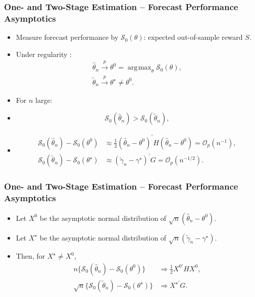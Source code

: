 \documentclass[aspectratio=169]{beamer}
\DeclareMathOperator*{\argmax}{\arg\!\max}
\begin{document}
\begin{frame}
\frametitle{One- and Two-Stage Estimation -- Forecast Performance Asymptotics}
\begin{itemize}
\item<2-> Measure forecast performance by $\mathcal{S}_0(\theta)$: expected out-of-sample reward $S$.
\item<3-> Under regularity \citep{Newey1994}:
\begin{gather*}
\hat{\theta}_n \overset{p}{\to} \theta^0 = \argmax_{\theta} \mathcal{S}_0(\theta), \\
\tilde{\theta}_n \overset{p}{\to} \theta^{\star} \neq \theta^0.
\end{gather*}
\item<4-> For $n$ large:
\item<5->[] \begin{equation*}
\mathcal{S}_0(\hat{\theta}_n) > \mathcal{S}_0(\tilde{\theta}_n),
\end{equation*}
\item<6->[] \begin{align*}
\mathcal{S}_0(\hat{\theta}_n) - \mathcal{S}_0(\theta^0) &\approx \frac{1}{2} (\hat{\theta}_n - \theta^0)^{\prime} H (\hat{\theta}_n - \theta^0) = \mathcal{O}_p(n^{-1}), \\
\mathcal{S}_0(\tilde{\theta}_n) - \mathcal{S}_0(\theta^{\star}) &\approx (\tilde{\gamma}_n - \gamma^{\star})^{\prime} G = \mathcal{O}_p(n^{-1/2}). 
\end{align*}
\end{itemize}
\end{frame}

\begin{frame}
\frametitle{One- and Two-Stage Estimation -- Forecast Performance Asymptotics}
\begin{itemize}
\item<1-> Let $X^0$ be the asymptotic normal distribution of $\sqrt{n}(\hat{\theta}_n - \theta^0)$.
\vspace{\negspace}
\item<2-> Let $X^{\star}$ be the asymptotic normal distribution of $\sqrt{n}(\tilde{\gamma}_n - \gamma^{\star})$.
\vspace{\negspace}
\item<3-> Then, for $X^{\star} \ne X^0$,
\vspace{\negspace}
\begin{align*}
n \{ \mathcal{S}_0(\hat{\theta}_n) - \mathcal{S}_0(\theta^0) \} &\Rightarrow \frac{1}{2} X^{0 \prime} H X^0, \\[8mm]
\sqrt{n} \{ \mathcal{S}_0(\tilde{\theta}_n) - \mathcal{S}_0(\theta^{\star}) \} &\Rightarrow X^{\star \prime} G.
\end{align*}
\end{itemize}
\end{frame}
\end{document}
